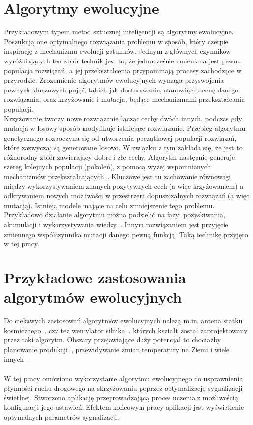 \section*{Algorytmy ewolucyjne} Przykładowym typem metod sztucznej inteligencji są algorytmy ewolucyjne. Poszukują one optymalnego rozwiązania problemu w sposób, który czerpie inspirację z mechanizmu ewolucji gatunków. Jednym z głównych czynników wyróżniających ten zbiór technik jest to, że jednocześnie zmieniana jest pewna populacja rozwiązań, a jej przekształcenia przypominają procesy zachodzące w przyrodzie. Zrozumienie algorytmów ewolucyjnych wymaga przyswojenia pewnych kluczowych pojęć, takich jak dostosowanie, stanowiące ocenę danego rozwiązania, oraz krzyżowanie i mutacja, będące mechanizmami przekształcania populacji. \\Krzyżowanie tworzy nowe rozwiązanie łącząc cechy dwóch innych, podczas gdy mutacja w losowy sposób modyfikuje istniejące rozwiązanie. 
Przebieg algorytmu genetycznego rozpoczyna się od utworzenia początkowej populacji rozwiązań, które zazwyczaj są generowane losowo. W związku z tym zakłada się, że jest to różnorodny zbiór zawierający dobre i złe cechy.
Algorytm następnie generuje szereg kolejnych populacji (pokoleń), z pomocą wyżej wspomnianych mechanizmów przekształcających~\cite{Cohoon:2003:EAP:903758.903786}. Kluczowe jest tu zachowanie równowagi między wykorzystywaniem znanych pozytywnych cech (a więc krzyżowaniem) a odkrywaniem nowych możliwości w przestrzeni dopuszczalnych rozwiązań (a więc mutacją). Istnieją modele mające na celu zmniejszenie tego problemu. Przykładowo działanie algorytmu można podzielić na fazy: pozyskiwania, akumulacji i wykorzystywania wiedzy~\cite{10.1371/journal.pone.0095693}. Innym rozwiązaniem jest przyjęcie zmiennego współczynnika mutacji danego pewną funkcją. Taką technikę przyjęto w tej pracy. 
\section*{Przykładowe zastosowania algorytmów ewolucyjnych} Do ciekawych zastosowań algorytmów ewolucyjnych należą m.in. antena statku kosmicznego~\cite{Lohn2006AutomatedAD}, czy też wentylator silnika~\cite{article}, których kształt został zaprojektowany przez taki algorytm. Obszary przejawiające duży potencjał to chociażby planowanie produkcji~\cite{Wall:1996:GAR:925320}, przewidywanie zmian temperatury na Ziemi\cite{Stanislawska:2012:MGT:2400749.2401077} i wiele innych~\cite{Steinbuch2010}.
\paragraph{}W tej pracy omówiono wykorzystanie algorytmu ewolucyjnego do usprawnienia płynności ruchu drogowego na skrzyżowaniu poprzez optymalizację sygnalizacji świetlnej. Stworzono aplikację przeprowadzającą proces uczenia z możliwością konfiguracji jego ustawień. Efektem końcowym pracy aplikacji jest wyświetlenie optymalnych parametrów sygnalizacji.
